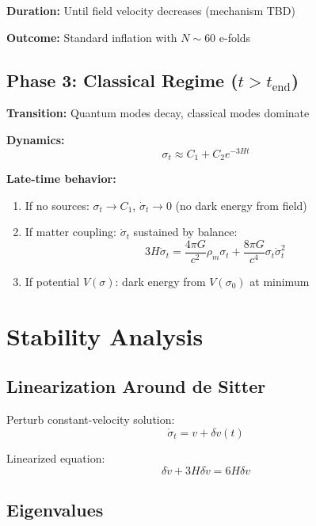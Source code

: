 \documentclass[11pt,a4paper]{article}
\theoremstyle{definition}
\theoremstyle{remark}
\begin{document}
	\textbf{Duration:} Until field velocity decreases (mechanism TBD)
	
	\textbf{Outcome:} Standard inflation with $N \sim 60$ e-folds
	
	\subsection{Phase 3: Classical Regime ($t > t_{\text{end}}$)}
	
	\textbf{Transition:} Quantum modes decay, classical modes dominate
	
	\textbf{Dynamics:}
	\begin{equation}
		\sigma_t \approx C_1 + C_2 e^{-3Ht}
	\end{equation}
	
	\textbf{Late-time behavior:}
	\begin{enumerate}
		\item If no sources: $\sigma_t \to C_1$, $\dot{\sigma}_t \to 0$ (no dark energy from field)
		\item If matter coupling: $\dot{\sigma}_t$ sustained by balance:
		\begin{equation}
			3H\dot{\sigma}_t = \frac{4\pi G}{c^2}\rho_m\sigma_t + \frac{8\pi G}{c^4}\sigma_t\dot{\sigma}_t^2
		\end{equation}
		\item If potential $V(\sigma)$: dark energy from $V(\sigma_0)$ at minimum
	\end{enumerate}
	
	\section{Stability Analysis}
	
	\subsection{Linearization Around de Sitter}
	
	Perturb constant-velocity solution:
	\begin{equation}
		\dot{\sigma}_t = v + \delta v(t)
	\end{equation}
	
	Linearized equation:
	\begin{equation}
		\delta\ddot{v} + 3H\delta\dot{v} = 6H\delta v
	\end{equation}
	
	\subsection{Eigenvalues}
	
\end{document}
